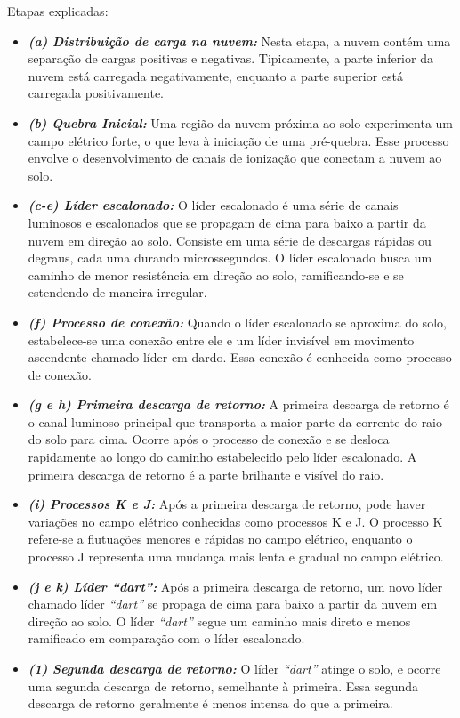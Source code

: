 \documentclass[a4paper, 12pt, onecolumn,singlespacing]{article}
\begin{document}
	Etapas explicadas: 
	
	\begin{itemize}
		\item  \textbf{\textit{ (a) Distribuição de carga na nuvem:} }Nesta etapa, a nuvem contém uma separação de cargas positivas e negativas. Tipicamente, a parte inferior da nuvem está carregada negativamente, enquanto a parte superior está carregada positivamente.
		
		\item \textbf{\textit{(b) Quebra Inicial:}} Uma região da nuvem próxima ao solo experimenta um campo elétrico forte, o que leva à iniciação de uma pré-quebra. Esse processo envolve o desenvolvimento de canais de ionização que conectam a nuvem ao solo.
		
		\item \textbf{\textit{(c-e) Líder escalonado:}} O líder escalonado é uma série de canais luminosos e escalonados que se propagam de cima para baixo a partir da nuvem em direção ao solo. Consiste em uma série de descargas rápidas ou degraus, cada uma durando microssegundos. O líder escalonado busca um caminho de menor resistência em direção ao solo, ramificando-se e se estendendo de maneira irregular.
		
		\item \textbf{\textit{(f) Processo de conexão:}} Quando o líder escalonado se aproxima do solo, estabelece-se uma conexão entre ele e um líder invisível em movimento ascendente chamado líder em dardo. Essa conexão é conhecida como processo de conexão.
		
		\item \textbf{\textit{(g e h) Primeira descarga de retorno:}} A primeira descarga de retorno é o canal luminoso principal que transporta a maior parte da corrente do raio do solo para cima. Ocorre após o processo de conexão e se desloca rapidamente ao longo do caminho estabelecido pelo líder escalonado. A primeira descarga de retorno é a parte brilhante e visível do raio.
		
		\item \textbf{\textit{(i) Processos K e J:}} Após a primeira descarga de retorno, pode haver variações no campo elétrico conhecidas como processos K e J. O processo K refere-se a flutuações menores e rápidas no campo elétrico, enquanto o processo J representa uma mudança mais lenta e gradual no campo elétrico.
		
		\item \textbf{\textit{(j e k) Líder \textit{``dart''}:}} Após a primeira descarga de retorno, um novo líder chamado líder \textit{``dart''} se propaga de cima para baixo a partir da nuvem em direção ao solo. O líder \textit{``dart''} segue um caminho mais direto e menos ramificado em comparação com o líder escalonado.
		
		\item \textbf{\textit{(1) Segunda descarga de retorno: }}O líder \textit{``dart''} atinge o solo, e ocorre uma segunda descarga de retorno, semelhante à primeira. Essa segunda descarga de retorno geralmente é menos intensa do que a primeira.
		
	\end{itemize}
	
\end{document}
